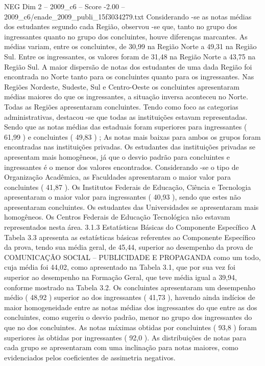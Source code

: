 \begin{textsample}{NEG Dim 2 – 2009\_c6 – Score -2.00 – 2009\_c6/enade\_2009\_publi\_15f3034279.txt}
Considerando -se as notas médias dos estudantes segundo cada Região, observou -se que, tanto no grupo dos ingressantes quanto no grupo dos concluintes, houve diferenças marcantes.
As médias variam, entre os concluintes, de 30,99 na Região Norte a 49,31 na Região Sul.
Entre os ingressantes, os valores foram de 31,48 na Região Norte a 43,75 na Região Sul.
A maior dispersão de notas dos estudantes de uma dada Região foi encontrada no Norte tanto para os concluintes quanto para os ingressantes.
Nas Regiões Nordeste, Sudeste, Sul e Centro-Oeste os concluintes apresentaram médias maiores do que os ingressantes, a situação inversa aconteceu no Norte.
Todas as Regiões apresentaram concluintes.
Tendo como foco as categorias administrativas, destacou -se que todas as instituições estavam representadas.
Sendo que as notas médias das estaduais foram superiores para ingressantes ( 61,99 ) e concluintes ( 49,83 ) ; As notas mais baixas para ambos os grupos foram encontradas nas instituições privadas.
Os estudantes das instituições privadas se apresentam mais homogêneos, já que o desvio padrão para concluintes e ingressantes é o menor dos valores encontrados.
Considerando -se o tipo de Organização Acadêmica, as Faculdades apresentaram o maior valor para concluintes ( 41,87 ).
Os Institutos Federais de Educação, Ciência e Tecnologia apresentaram o maior valor para ingressantes ( 40,93 ), sendo que estes não apresentaram concluintes.
Os estudantes das Universidades se apresentaram mais homogêneos.
Os Centros Federais de Educação Tecnológica não estavam representados nesta área. 3.1.3 Estatísticas Básicas do Componente Específico A Tabela 3.3 apresenta as estatísticas básicas referentes ao Componente Específico da prova, tendo sua média geral, de 45,44, superior ao desempenho da prova de COMUNICAÇÃO SOCIAL – PUBLICIDADE E PROPAGANDA como um todo, cuja média foi 44,02, como apresentado na Tabela 3.1, que por sua vez foi superior ao desempenho na Formação Geral, que teve média igual a 39,94, conforme mostrado na Tabela 3.2.
Os concluintes apresentaram um desempenho médio ( 48,92 ) superior ao dos ingressantes ( 41,73 ), havendo ainda indícios de maior homogeneidade entre as notas médias dos ingressantes do que entre as dos concluintes, como sugeriu o desvio padrão, menor no grupo dos ingressantes do que no dos concluintes.
As notas máximas obtidas por concluintes ( 93,8 ) foram superiores às obtidas por ingressantes ( 92,0 ).
As distribuições de notas para cada grupo se apresentaram com uma inclinação para notas maiores, como evidenciados pelos coeficientes de assimetria negativos.

\end{textsample}
